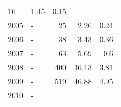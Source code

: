 \begin{longtable}{lXrrr}
       \num{16} &
       \num[round-mode=places,round-precision=2]{1.45} &
         \num[round-mode=places,round-precision=2]{0.15} \\

     2005 &
     \multicolumn{1}{X}{ -  } &


       \num{25} &
       \num[round-mode=places,round-precision=2]{2.26} &
         \num[round-mode=places,round-precision=2]{0.24} \\

     2006 &
     \multicolumn{1}{X}{ -  } &


       \num{38} &
       \num[round-mode=places,round-precision=2]{3.43} &
         \num[round-mode=places,round-precision=2]{0.36} \\

     2007 &
     \multicolumn{1}{X}{ -  } &


       \num{63} &
       \num[round-mode=places,round-precision=2]{5.69} &
         \num[round-mode=places,round-precision=2]{0.6} \\

     2008 &
     \multicolumn{1}{X}{ -  } &


       \num{400} &
       \num[round-mode=places,round-precision=2]{36.13} &
         \num[round-mode=places,round-precision=2]{3.81} \\

     2009 &
     \multicolumn{1}{X}{ -  } &


       \num{519} &
       \num[round-mode=places,round-precision=2]{46.88} &
         \num[round-mode=places,round-precision=2]{4.95} \\

     2010 &
     \multicolumn{1}{X}{ -  } &



\end{longtable}
